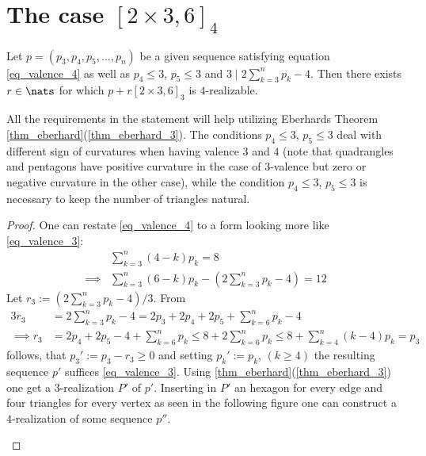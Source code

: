 \section{The case $[2 \times 3, 6]_4$}
\begin{lemma}
  Let $p = (p_3, p_4, p_5, \dots, p_n)$ be a given sequence satisfying equation \ref{eq_valence_4} as well as $p_4 \leq 3$, $p_5 \leq 3$ and $3 \mid 2 \sum_{k=3}^{n} p_k - 4$. Then there exists $r \in \nats$ for which $p + r [2 \times 3, 6]_3$ is $4$-realizable.

  All the requirements in the statement will help utilizing Eberhards Theorem \ref{thm_eberhard}(\ref{thm_eberhard_3}). The conditions $p_4 \leq 3$, $p_5 \leq 3$ deal with different sign of curvatures when having valence $3$ and $4$ (note that quadrangles and pentagons have positive curvature in the case of $3$-valence but zero or negative curvature in the other case), while the condition $p_4 \leq 3$, $p_5 \leq 3$ is necessary to keep the number of triangles natural. 
  \begin{proof}
    One can restate \ref{eq_valence_4} to a form looking more like \ref{eq_valence_3}:
    \begin{align*}
      & \sum_{k=3}^n \left( 4 - k \right) p_k = 8 \\
      \implies & \sum_{k=3}^n \left( 6 - k \right) p_k - \left(2 \sum_{k=3}^n  p_k - 4 \right) = 12
    \end{align*}
    Let $r_3 := (2 \sum_{k=3}^{n} p_k - 4)/3$. From
    \begin{align*}
      3 r_3 &= 2 \sum_{k=3}^{n} p_k - 4 =  2 p_3 + 2 p_4 + 2 p_5 + \sum_{k=6}^{n} p_k - 4\\
      \implies r_3 &= 2 p_4 + 2 p_5 - 4 + \sum_{k=6}^{n} p_k \leq 8 + 2 \sum_{k=6}^{n} p_k \leq 8 + \sum_{k=4}^{n} (k - 4) p_k = p_3
    \end{align*}
    follows, that $p_3' := p_3 - r_3 \geq 0$ and setting $p_k' := p_k$, $(k \geq 4)$ the resulting sequence $p'$ suffices \ref{eq_valence_3}. Using \ref{thm_eberhard}(\ref{thm_eberhard_3}) one get a $3$-realization $P'$ of $p'$. Inserting in $P'$ an hexagon for every edge and four triangles for every vertex as seen in the following figure one can construct a $4$-realization of some sequence $p''$.
    \begin{figure}[htpp]
      \centering
\end{figure}
\end{proof}
\end{lemma}
